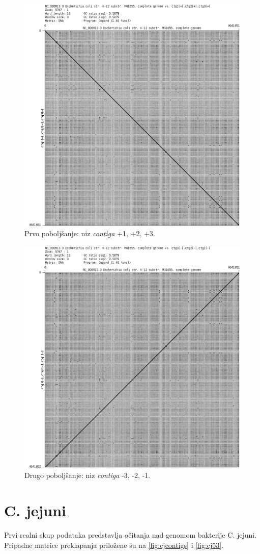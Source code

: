 \documentclass[times, utf8, seminar, numeric]{fer}
\begin{document}
\begin{figure}[h]
	\centering
	\centerline{\includegraphics[width=0.7\linewidth]{img/ec_1_2_3}}
	\caption{Prvo poboljšanje: niz \textit{contiga} +1, +2, +3.}
	\label{fig:ec123}
\end{figure}

\begin{figure}[h]
	\centering
	\centerline{\includegraphics[width=0.7\linewidth]{img/ec_3_2_1_neg}}
	\caption{Drugo poboljšanje: niz \textit{contiga} -3, -2, -1.}
	\label{fig:ec321neg}
\end{figure}


\section{C. jejuni}
Prvi realni skup podataka predstavlja očitanja nad genomom bakterije C. jejuni. Pripadne matrice preklapanja priložene su na \ref{fig:cjcontigs} i \ref{fig:cj53}.
\end{document}
